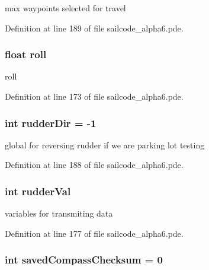 max waypoints selected for travel 



\-Definition at line 189 of file sailcode\-\_\-alpha6.\-pde.

\hypertarget{group__group1_ga26fd84d522945b6038221d9e38c7cc39}{
\subsubsection[{roll}]{\setlength{\rightskip}{0pt plus 5cm}float {\bf roll}}}
\label{group__group1_ga26fd84d522945b6038221d9e38c7cc39}


roll 



\-Definition at line 173 of file sailcode\-\_\-alpha6.\-pde.

\hypertarget{group__group1_gaf79de3204853b3b4101113683e74cd54}{
\subsubsection[{rudder\-Dir}]{\setlength{\rightskip}{0pt plus 5cm}int {\bf rudder\-Dir} = -\/1}}
\label{group__group1_gaf79de3204853b3b4101113683e74cd54}


global for reversing rudder if we are parking lot testing 



\-Definition at line 188 of file sailcode\-\_\-alpha6.\-pde.

\hypertarget{group__group1_ga8b212bdc5d94214c0e3803a696f2f676}{
\subsubsection[{rudder\-Val}]{\setlength{\rightskip}{0pt plus 5cm}int {\bf rudder\-Val}}}
\label{group__group1_ga8b212bdc5d94214c0e3803a696f2f676}


variables for transmiting data 



\-Definition at line 177 of file sailcode\-\_\-alpha6.\-pde.

\hypertarget{group__group1_ga6e28e651127135816788318d7b473dc8}{
\subsubsection[{saved\-Compass\-Checksum}]{\setlength{\rightskip}{0pt plus 5cm}int {\bf saved\-Compass\-Checksum} = 0}}
\label{group__group1_ga6e28e651127135816788318d7b473dc8}


